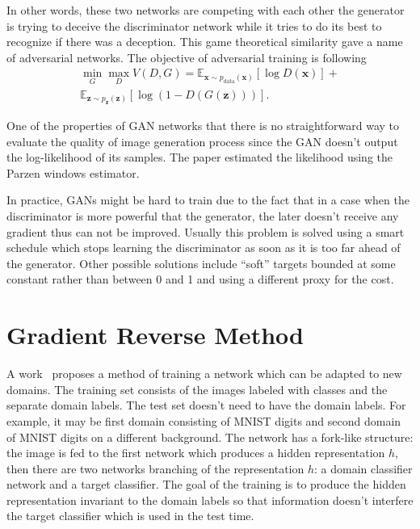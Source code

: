 \documentclass{article}
\begin{document}
    In other words, these two networks are competing with each other the 
    generator is trying to deceive the discriminator network while it tries
    to do its best to recognize if there was a deception. This game theoretical
    similarity gave a name of adversarial networks. The objective of adversarial
    training is following
    \begin{align*}
        \min_G \max_D V(D, G) = \mathbb{E}_{\bm{x} \sim p_{\text{data}}(\bm{x})}[\log D(\bm{x})] + \\
          \mathbb{E}_{\bm{z} \sim p_{\bm{z}}(\bm{z})}[\log (1 - D(G(\bm{z})))].
    \end{align*}

    One of the properties of GAN networks that there is no straightforward way 
    to evaluate the quality of image generation process since the GAN doesn't 
    output the log-likelihood of its samples. The paper estimated the likelihood
    using the Parzen windows estimator.

    In practice, GANs might be hard to train due to the fact that in a case when 
    the discriminator is more powerful that the generator, the later doesn't 
    receive any gradient thus can not be improved. Usually this problem is solved
    using a smart schedule which stops learning the discriminator as soon as it
    is too far ahead of the generator. Other possible solutions include ``soft''
    targets bounded at some constant rather than between 0 and 1 and using a 
    different proxy for the cost.

\section{Gradient Reverse Method}
\label{sec:gradient-reverse}

    A work~\cite{ganin2014unsupervised} proposes a method of training a network 
    which can be adapted to new domains. The training set consists of the images
    labeled with classes and the separate domain labels. The test set doesn't need
    to have the domain labels. For example, it may be first domain
    consisting of MNIST digits and second domain of MNIST digits on a different
    background. The network has a fork-like structure: the image is fed to the
    first network which produces a hidden representation $h$, then there are two
    networks branching of the representation $h$: a domain classifier network and 
    a target classifier. The goal of the training is to produce the hidden 
    representation invariant to the domain labels so that information doesn't 
    interfere the target classifier which is used in the test time.
\end{document}

